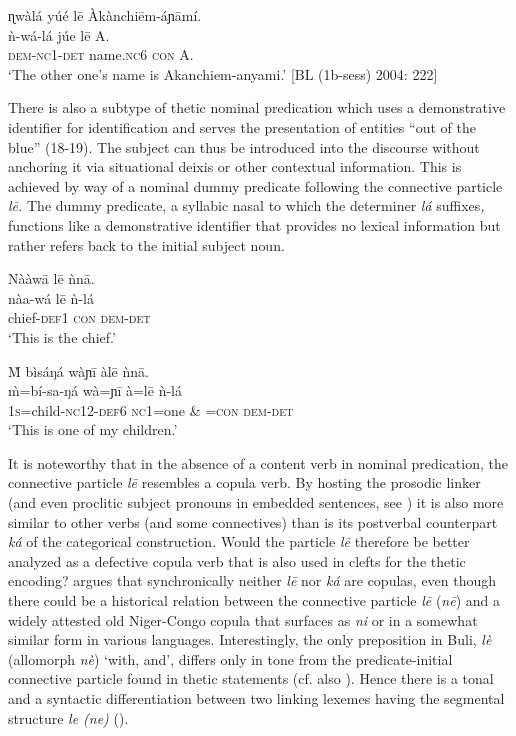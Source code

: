 \documentclass[output=paper]{langsci/langscibook}
\begin{document}
\ea
\glll \textup{}  ɳwàlá     yúé    l\={e}   Àkànchi\={e}m-áɲ\={a}mí.\\
  \textup{  ǹ}\textup{{}-wá-lá   júe    l\={e}   A.}\\
     \textsc{  }\textsc{dem}{}-\textsc{nc}1-\textsc{det  }name\textsc{.nc}6  \textsc{con}  A.\\
\glt ‘The other one’s name is Akanchiem-anyami.’ [BL (1b-sess) 2004: 222]
\z

There is also a subtype of thetic nominal predication which uses a demonstrative identifier for identification and serves the presentation of entities “out of the blue” (18-19). The subject can thus be introduced into the discourse without anchoring it via situational deixis or other contextual information. This is achieved by way of a nominal dummy predicate following the connective particle \textit{l\={e}. }The dummy predicate, a syllabic nasal to which the determiner \textit{lá }suffixes\textit{, }functions like a demonstrative identifier that provides no lexical information but rather refers back to the initial subject noun.

\ea
\glll \textup{}  Nààw\={a}    l\={e}  ǹn\={a}.\\
  \textup{  nàa-wá    l\={e}  ǹ-lá}\\
       chief-\textsc{def1}  \textsc{con}  \textsc{dem}{}-\textsc{det}\\
\glt ‘This is the chief.’ \citep[88]{Schwarz2007}
\z

\ea
\glll \textup{}  \`{M}   bìsáŋá    wàɲ\={i}    àl\={e}    ǹn\={a}.\\
  \textup{  \`{m}=bí-sa-ŋá    wà=ɲ\={i}    à=l\={e}    ǹ-lá}\\
       1\textsc{s}=child-\textsc{nc}12-\textsc{def}6  \textsc{nc}1=one  \& =\textsc{con}  \textsc{dem-det}\\
\glt ‘This is one of my children.’ \citep[88]{Schwarz2007}
\z

It is noteworthy that in the absence of a content verb in nominal predication, the connective particle \textit{l\={e}} resembles a copula verb. By hosting the prosodic linker (and even proclitic subject pronouns in embedded sentences, see ) it is also more similar to other verbs (and some connectives) than is its postverbal counterpart \textit{ká }of the categorical construction\textit{. }Would the particle \textit{l\={e} }therefore be better analyzed as a defective copula verb that is also used in clefts for the thetic encoding? \citet{Schwarz2009} argues that synchronically neither \textit{l\={e} }nor \textit{ká} are copulas, even though there could be a historical relation between the connective particle \textit{l\={e} }(\textit{n\={e}}) and a widely attested old Niger-Congo copula that surfaces as \textit{ni }or in a somewhat similar form in various languages. Interestingly, the only preposition in Buli, \textit{lè }(allomorph \textit{nè}) ‘with, and’, differs only in tone from the predicate-initial connective particle found in thetic statements (cf. also \citealt{Schwarz2010a}). Hence there is a tonal and a syntactic differentiation between two linking lexemes having the segmental structure \textit{le (ne) }().
\end{document}
